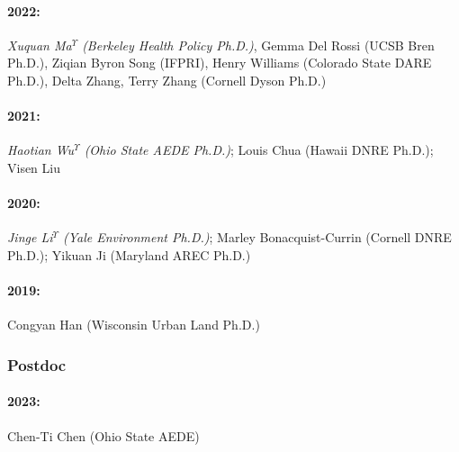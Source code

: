 \documentclass[11pt]{res} %
\begin{document}
\begin{resume}
\paragraph{2022:} \textit{Xuquan Ma$^\Upsilon$ (Berkeley Health Policy Ph.D.)}, Gemma Del Rossi (UCSB Bren Ph.D.), Ziqian Byron Song (IFPRI), Henry Williams (Colorado State DARE Ph.D.), Delta Zhang, Terry Zhang (Cornell Dyson Ph.D.)
\vspace{-.35in}
\paragraph{2021:} \textit{Haotian Wu$^\Upsilon$ (Ohio State AEDE Ph.D.)}; Louis Chua (Hawaii DNRE Ph.D.); Visen Liu
\vspace{-.35in}
\paragraph{2020:} \textit{Jinge Li$^\Upsilon$ (Yale Environment Ph.D.)}; Marley Bonacquist-Currin (Cornell DNRE Ph.D.); Yikuan Ji (Maryland AREC Ph.D.)
\vspace{-.35in}
\paragraph{2019:} Congyan Han (Wisconsin Urban Land Ph.D.)

\vspace{-.2in}

\subsubsection{Postdoc}\vspace{-.2in}
\paragraph{2023:} Chen-Ti Chen (Ohio State AEDE)

\vspace{-.2in}




\end{resume}
\end{document}
